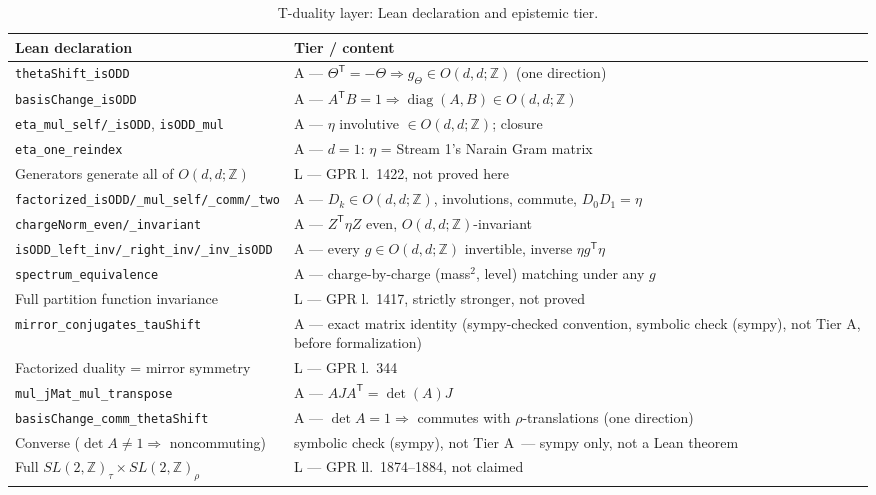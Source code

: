 \documentclass[11pt,a4paper]{article}
\theoremstyle{remark}
\newcommand{\tierS}{\colorbox{gray!15}{\textsf{\scriptsize symbolic check (sympy), not Tier A}}}
\begin{document}
\begin{table}[htbp]
\centering\footnotesize
\caption{T-duality layer: Lean declaration and epistemic tier.}
\label{tab:tduality}
\begin{tabular}{@{}l l@{}}
\toprule
\textbf{Lean declaration} & \textbf{Tier / content} \\ \midrule
\texttt{thetaShift\_isODD} & A --- $\Theta^{\mathsf T}=-\Theta \Rightarrow g_\Theta\in O(d,d;\mathbb{Z})$ (one direction) \\
\texttt{basisChange\_isODD} & A --- $A^{\mathsf T}B=1\Rightarrow\operatorname{diag}(A,B)\in O(d,d;\mathbb{Z})$ \\
\texttt{eta\_mul\_self/\_isODD}, \texttt{isODD\_mul} & A --- $\eta$ involutive $\in O(d,d;\mathbb{Z})$; closure \\
\texttt{eta\_one\_reindex} & A --- $d=1$: $\eta$ = Stream 1's Narain Gram matrix \\
Generators generate all of $O(d,d;\mathbb{Z})$ & L --- GPR l.~1422, not proved here \\
\texttt{factorized\_isODD/\_mul\_self/\_comm/\_two} & A --- $D_k\in O(d,d;\mathbb{Z})$, involutions, commute, $D_0D_1=\eta$ \\
\texttt{chargeNorm\_even/\_invariant} & A --- $Z^{\mathsf T}\eta Z$ even, $O(d,d;\mathbb{Z})$-invariant \\
\texttt{isODD\_left\_inv/\_right\_inv/\_inv\_isODD} & A --- every $g\in O(d,d;\mathbb{Z})$ invertible, inverse $\eta g^{\mathsf T}\eta$ \\
\texttt{spectrum\_equivalence} & A --- charge-by-charge (mass$^2$, level) matching under any $g$ \\
Full partition function invariance & L --- GPR l.~1417, strictly stronger, not proved \\
\texttt{mirror\_conjugates\_tauShift} & A --- exact matrix identity (sympy-checked convention, \tierS, before formalization) \\
Factorized duality = mirror symmetry & L --- GPR l.~344 \\
\texttt{mul\_jMat\_mul\_transpose} & A --- $AJA^{\mathsf T}=\det(A)J$ \\
\texttt{basisChange\_comm\_thetaShift} & A --- $\det A=1\Rightarrow$ commutes with $\rho$-translations (one direction) \\
Converse ($\det A\ne1\Rightarrow$ noncommuting) & \tierS\ --- sympy only, not a Lean theorem \\
Full $SL(2,\mathbb{Z})_\tau\times SL(2,\mathbb{Z})_\rho$ & L --- GPR ll.~1874--1884, not claimed \\
\bottomrule
\end{tabular}
\end{table}
\end{document}
